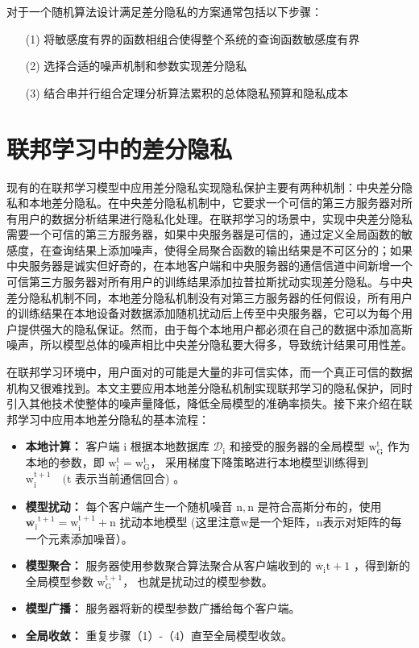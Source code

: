 对于一个随机算法设计满足差分隐私的方案通常包括以下步骤：
\begin{enumerate}
\item [(1)] 将敏感度有界的函数相组合使得整个系统的查询函数敏感度有界
\item [(2)] 选择合适的噪声机制和参数实现差分隐私
\item [(3)] 结合串并行组合定理分析算法累积的总体隐私预算和隐私成本
\end{enumerate}

\section{联邦学习中的差分隐私}
现有的在联邦学习模型中应用差分隐私实现隐私保护主要有两种机制：中央差分隐私和本地差分隐私。在中央差分隐私机制中，它要求一个可信的第三方服务器对所有用户的数据分析结果进行隐私化处理。在联邦学习的场景中，实现中央差分隐私需要一个可信的第三方服务器，如果中央服务器是可信的，通过定义全局函数的敏感度，在查询结果上添加噪声，使得全局聚合函数的输出结果是不可区分的；如果中央服务器是诚实但好奇的，在本地客户端和中央服务器的通信信道中间新增一个可信第三方服务器对所有用户的训练结果添加拉普拉斯扰动实现差分隐私。与中央差分隐私机制不同，本地差分隐私机制没有对第三方服务器的任何假设，所有用户的训练结果在本地设备对数据添加随机扰动后上传至中央服务器，它可以为每个用户提供强大的隐私保证。然而，由于每个本地用户都必须在自己的数据中添加高斯噪声，所以模型总体的噪声相比中央差分隐私要大得多，导致统计结果可用性差。

在联邦学习环境中，用户面对的可能是大量的非可信实体，而一个真正可信的数据机构又很难找到。本文主要应用本地差分隐私机制实现联邦学习的隐私保护，同时引入其他技术使整体的噪声量降低，降低全局模型的准确率损失。接下来介绍在联邦学习中应用本地差分隐私的基本流程：
\begin{itemize}
\item \textbf{本地计算：}
客户端 $\mathrm{i}$ 根据本地数据库 $\mathcal{D}_{\mathrm{i}}$ 和接受的服务器的全局模型 $\mathrm{w}_{\mathrm{G}}^{\mathrm{t}}$ 作为本地的参数，即 $\mathrm{w}_{\mathrm{i}}^{\mathrm{t}}=\mathrm{w}_{\mathrm{G}}^{\mathrm{t}}$， 采用梯度下降策略进行本地模型训练得到 $\mathrm{w}_{\mathrm{i}}^{\mathrm{t}+1} \quad(\mathrm{t}$ 表示当前通信回合) 。

\item \textbf{模型扰动：}
每个客户端产生一个随机噪音 $\mathrm{n},\mathrm{n}$ 是符合高斯分布的，使用 $\overline{\mathbf{w}_{\mathrm{i}}}^{\mathrm{t}+1}=\mathrm{w}_{\mathrm{i}}^{\mathrm{t}+1}+\mathrm{n}$ 扰动本地模型 (这里注意w是一个矩阵，n表示对矩阵的每一个元素添加噪音）。

\item \textbf{模型聚合：}
服务器使用参数聚合算法聚合从客户端收到的 $\overline{\mathrm{w}}_{\mathrm{i}} \mathrm{t}+1$ ，得到新的全局模型参数 $\mathrm{w}_{\mathrm{G}}^{\mathrm{t}+1}$， 也就是扰动过的模型参数。

\item \textbf{模型广播：}
服务器将新的模型参数广播给每个客户端。

\item \textbf{全局收敛：}
重复步骤（1）-（4）直至全局模型收敛。
\end{itemize}


